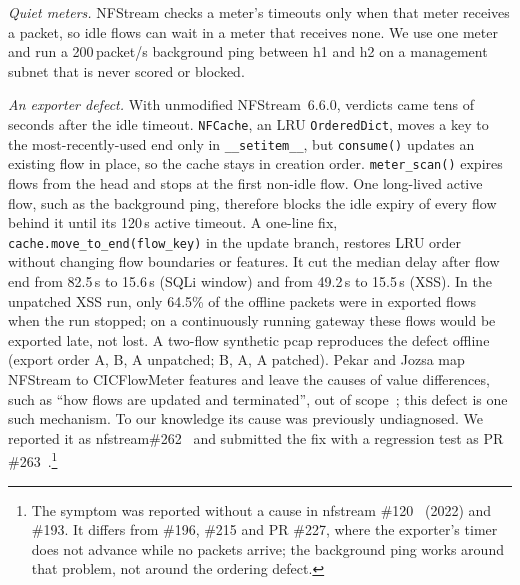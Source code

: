 \emph{Quiet meters.} NFStream checks a meter's timeouts only when that meter receives a packet, so idle flows can wait in a meter that receives none. We use one meter and run a 200\,packet/s background ping between h1 and h2 on a management subnet that is never scored or blocked.

\emph{An exporter defect.} With unmodified NFStream~6.6.0, verdicts came tens of seconds after the idle timeout. \texttt{NFCache}, an LRU \texttt{OrderedDict}, moves a key to the most-recently-used end only in \texttt{\_\_setitem\_\_}, but \texttt{consume()} updates an existing flow in place, so the cache stays in creation order. \texttt{meter\_scan()} expires flows from the head and stops at the first non-idle flow. One long-lived active flow, such as the background ping, therefore blocks the idle expiry of every flow behind it until its 120\,s active timeout. A one-line fix, \texttt{cache.move\_to\_end(flow\_key)} in the update branch, restores LRU order without changing flow boundaries or features. It cut the median delay after flow end from 82.5\,s to 15.6\,s (SQLi window) and from 49.2\,s to 15.5\,s (XSS). In the unpatched XSS run, only 64.5\% of the offline packets were in exported flows when the run stopped; on a continuously running gateway these flows would be exported late, not lost. A two-flow synthetic pcap reproduces the defect offline (export order A, B, A unpatched; B, A, A patched). Pekar and Jozsa map NFStream to CICFlowMeter features and leave the causes of value differences, such as ``how flows are updated and terminated'', out of scope~\cite{pekar2024integrity}; this defect is one such mechanism. To our knowledge its cause was previously undiagnosed. We reported it as nfstream\#262~\cite{nfstream262} and submitted the fix with a regression test as PR \#263~\cite{nfstream263}.\footnote{The symptom was reported without a cause in nfstream \#120~\cite{nfstream120} (2022) and \#193. It differs from \#196, \#215 and PR \#227, where the exporter's timer does not advance while no packets arrive; the background ping works around that problem, not around the ordering defect.}
